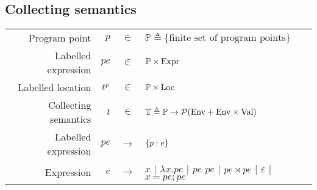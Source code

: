\documentclass{article}
\begin{document}
\subsection{Collecting semantics}
\begin{center}
	\begin{tabular}{rrcl}
		Program point        & $p$                & $\in$         & $\mathbb{P}\triangleq\{\text{finite set of program points}\}$                                  \\
		Labelled expression  & $pe$               & $\in$         & $\mathbb{P}\times\text{Expr}$                                                                        \\
		Labelled location    & ${\ell}^{p}$ & $\in$         & $\mathbb{P}\times\text{Loc}$                                                                         \\
		Collecting semantics & $t$                & $\in$         & $\mathbb{T}\triangleq\mathbb{P}\rightarrow\mathcal{P}(\text{Env}+\text{Env}\times\text{Val})$                        \\
		Labelled expression  & $pe$               & $\rightarrow$ & $\{{p}:{e}\}$                                                                                \\
		Expression           & $e$                & $\rightarrow$ & $x$ | $\lambda x.pe$ | $pe$ $pe$ | ${pe}\rtimes{pe}$ | $\varepsilon$ | $x\:\texttt{=}\:pe;pe$
	\end{tabular}
\end{center}
\end{document}
